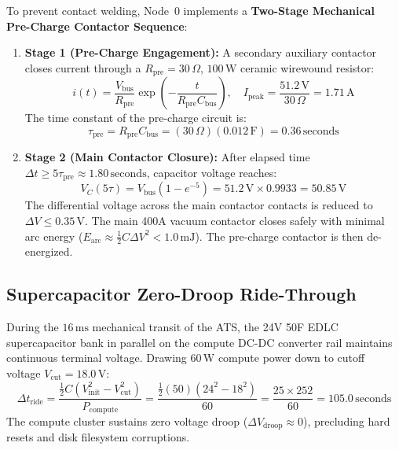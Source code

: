 To prevent contact welding, Node~0 implements a \textbf{Two-Stage Mechanical Pre-Charge Contactor Sequence}:
\begin{enumerate}
    \item \textbf{Stage 1 (Pre-Charge Engagement):} A secondary auxiliary contactor closes current through a $R_{\mathrm{pre}} = 30\,\Omega$, $100\,\mathrm{W}$ ceramic wirewound resistor:
    \begin{equation}
    i(t) = \frac{V_{\mathrm{bus}}}{R_{\mathrm{pre}}} \exp\left( -\frac{t}{R_{\mathrm{pre}} C_{\mathrm{bus}}} \right), \quad I_{\mathrm{peak}} = \frac{51.2\,\mathrm{V}}{30\,\Omega} = 1.71\,\mathrm{A}
    \label{eq:precharge_current}
    \end{equation}
    The time constant of the pre-charge circuit is:
    \begin{equation}
    \tau_{\mathrm{pre}} = R_{\mathrm{pre}} C_{\mathrm{bus}} = (30\,\Omega)(0.012\,\mathrm{F}) = 0.36\,\mathrm{seconds}
    \label{eq:precharge_tau}
    \end{equation}
    \item \textbf{Stage 2 (Main Contactor Closure):} After elapsed time $\Delta t \ge 5\tau_{\mathrm{pre}} \approx 1.80\,\mathrm{seconds}$, capacitor voltage reaches:
    \begin{equation}
    V_C(5\tau) = V_{\mathrm{bus}} \left(1 - e^{-5}\right) = 51.2\,\mathrm{V} \times 0.9933 = 50.85\,\mathrm{V}
    \label{eq:precharge_voltage_target}
    \end{equation}
    The differential voltage across the main contactor contacts is reduced to $\Delta V \le 0.35\,\mathrm{V}$. The main 400A vacuum contactor closes safely with minimal arc energy ($E_{\mathrm{arc}} \approx \frac{1}{2} C \Delta V^2 < 1.0\,\mathrm{mJ}$). The pre-charge contactor is then de-energized.
\end{enumerate}

\subsection{Supercapacitor Zero-Droop Ride-Through}
During the $16\,\mathrm{ms}$ mechanical transit of the ATS, the 24V 50F EDLC supercapacitor bank in parallel on the compute DC-DC converter rail maintains continuous terminal voltage. Drawing $60\,\mathrm{W}$ compute power down to cutoff voltage $V_{\mathrm{cut}} = 18.0\,\mathrm{V}$:
\begin{equation}
\Delta t_{\mathrm{ride}} = \frac{\frac{1}{2} C \left(V_{\mathrm{init}}^2 - V_{\mathrm{cut}}^2\right)}{P_{\mathrm{compute}}} = \frac{\frac{1}{2}(50)(24^2 - 18^2)}{60} = \frac{25 \times 252}{60} = 105.0\,\mathrm{seconds}
\label{eq:supercap_ride_time_ch2}
\end{equation}
The compute cluster sustains zero voltage droop ($\Delta V_{\mathrm{droop}} \approx 0$), precluding hard resets and disk filesystem corruptions.

